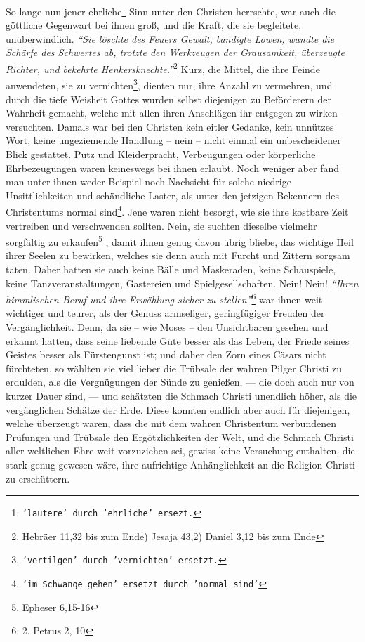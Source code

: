 \medskip

So lange nun jener ehrliche\footnote{\texttt{'lautere' durch 'ehrliche' ersezt.}}
Sinn unter den Christen herrschte, war auch die
göttliche Gegenwart bei ihnen groß, und die Kraft, die sie begleitete,
unüberwindlich.
\textit{"`Sie löschte des Feuers Gewalt, bändigte Löwen,
wandte die Schärfe des Schwertes ab, trotzte den Werkzeugen der Grausamkeit,
überzeugte Richter, und bekehrte Henkersknechte."'}\footnote{Hebräer 11,32 bis
zum Ende) Jesaja 43,2) Daniel 3,12 bis zum Ende}
Kurz, die Mittel, die ihre Feinde anwendeten, sie
zu vernichten\footnote{\texttt{'vertilgen' durch 'vernichten' ersetzt.}}, dienten
nur, ihre Anzahl zu vermehren, und durch die tiefe
Weisheit Gottes wurden selbst diejenigen zu Beförderern der Wahrheit gemacht,
welche mit allen ihren Anschlägen ihr entgegen zu wirken versuchten. Damals war
bei den Christen kein eitler Gedanke, kein unnützes Wort, keine ungeziemende
Handlung -- nein -- nicht einmal ein unbescheidener Blick gestattet. Putz und
Kleiderpracht, Verbeugungen oder körperliche Ehrbezeugungen waren keineswegs
bei ihnen erlaubt. Noch weniger aber fand man unter ihnen weder Beispiel noch
Nachsicht für solche niedrige Unsittlichkeiten und schändliche Laster, als unter
den jetzigen Bekennern des Christentums normal sind\footnote{\texttt{'im
Schwange gehen' ersetzt durch 'normal sind'}}.
Jene waren nicht
besorgt, wie sie ihre kostbare Zeit vertreiben und verschwenden sollten. Nein,
sie suchten dieselbe vielmehr sorgfältig zu erkaufen\footnote{Epheser 6,15-16}
,
damit ihnen genug davon übrig bliebe, das wichtige Heil ihrer Seelen zu
bewirken, welches sie denn auch mit Furcht und Zittern sorgsam taten. Daher
hatten sie auch keine Bälle und Maskeraden, keine Schauspiele, keine
Tanzveranstaltungen, Gastereien und Spielgesellschaften. Nein! Nein!
\textit{"`Ihren himmlischen Beruf und ihre Erwählung sicher zu
stellen"'}\footnote{2. Petrus 2, 10}
war ihnen weit wichtiger und teurer, als der Genuss armseliger, geringfügiger
Freuden der Vergänglichkeit. Denn, da sie -- wie Moses -- den Unsichtbaren
gesehen und erkannt hatten, dass seine liebende Güte besser als das Leben,
der Friede seines Geistes besser als Fürstengunst ist; und daher den Zorn eines
Cäsars nicht fürchteten, so wählten sie viel lieber die
Trübsale
der wahren Pilger Christi zu erdulden, als die
Vergnügungen der
Sünde zu genießen, — die doch auch nur von kurzer Dauer sind, — und schätzten
die Schmach Christi unendlich höher, als die vergänglichen Schätze der Erde.
Diese konnten endlich aber auch für diejenigen, welche überzeugt waren, dass
die mit dem wahren Christentum verbundenen Prüfungen und Trübsale den
Ergötzlichkeiten der Welt, und die Schmach Christi aller weltlichen Ehre weit
vorzuziehen sei, gewiss keine Versuchung enthalten, die stark genug gewesen
wäre,
ihre aufrichtige Anhänglichkeit an die Religion Christi zu erschüttern.


